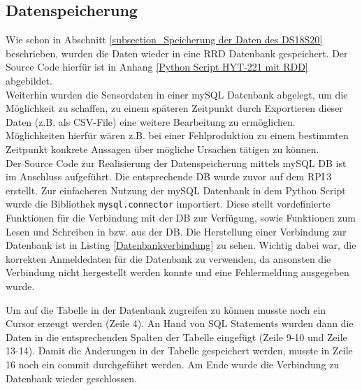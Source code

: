\subsection{Datenspeicherung}
\label{subsection_Datenspeicherung_HYT221}
Wie schon in Abschnitt \ref{subsection_Speicherung der Daten des DS18S20} beschrieben, wurden die Daten wieder in eine RRD Datenbank gespeichert. Der Source Code hierfür ist in Anhang \ref{Python Script HYT-221 mit RDD} abgebildet.\\
Weiterhin wurden die Sensordaten in einer mySQL Datenbank abgelegt, um die Möglichkeit zu schaffen, zu einem späteren Zeitpunkt durch Exportieren dieser Daten (z.B. als CSV-File) eine weitere Bearbeitung zu ermöglichen. Möglichkeiten hierfür wären z.B. bei einer Fehlproduktion zu einem bestimmten Zeitpunkt konkrete Aussagen über mögliche Ursachen tätigen zu können.\\
Der Source Code zur Realisierung der Datenspeicherung mittels mySQL DB ist im Anschluss aufgeführt. Die entsprechende DB wurde zuvor auf dem \ac{RPI}\,3 erstellt. Zur einfacheren Nutzung der mySQL Datenbank in dem Python Script wurde die Bibliothek \texttt{mysql.connector} importiert. Diese stellt vordefinierte Funktionen für die Verbindung mit der DB zur Verfügung, sowie Funktionen zum Lesen und Schreiben in bzw. aus der DB. Die Herstellung einer Verbindung zur Datenbank ist in Listing \ref{Datenbankverbindung} zu sehen.
Wichtig dabei war, die korrekten Anmeldedaten für die Datenbank zu verwenden, da ansonsten die Verbindung nicht hergestellt werden konnte und eine Fehlermeldung ausgegeben wurde.



Um auf die Tabelle in der Datenbank zugreifen zu können musste noch ein Cursor erzeugt werden (Zeile 4). An Hand von SQL Statements wurden dann die Daten in die entsprechenden Spalten der Tabelle eingefügt (Zeile 9-10 und Zeile 13-14). Damit die Änderungen in der Tabelle gespeichert werden, musste in Zeile 16 noch ein commit durchgeführt werden. Am Ende wurde die Verbindung zu Datenbank wieder geschlossen.



